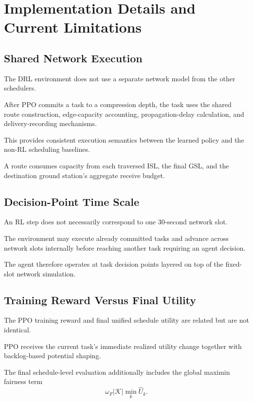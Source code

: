 \documentclass[11pt]{article}
\begin{document}
\section{Implementation Details and Current Limitations}

\subsection{Shared Network Execution}

The DRL environment does not use a separate network model from the other
schedulers.

After PPO commits a task to a compression depth, the task uses the shared
route construction, edge-capacity accounting, propagation-delay calculation,
and delivery-recording mechanisms.

This provides consistent execution semantics between the learned policy and
the non-RL scheduling baselines.

A route consumes capacity from each traversed ISL, the final GSL, and the
destination ground station's aggregate receive budget.


\subsection{Decision-Point Time Scale}

An RL step does not necessarily correspond to one 30-second network slot.

The environment may execute already committed tasks and advance across
network slots internally before reaching another task requiring an agent
decision.

The agent therefore operates at task decision points layered on top of the
fixed-slot network simulation.


\subsection{Training Reward Versus Final Utility}

The PPO training reward and final unified schedule utility are related but
are not identical.

PPO receives the current task's immediate realized utility change together
with backlog-based potential shaping.

The final schedule-level evaluation additionally includes the global maximin
fairness term
\[
\omega_F|\mathcal{K}|
\min_k\widehat{U}_k.
\]
\end{document}
